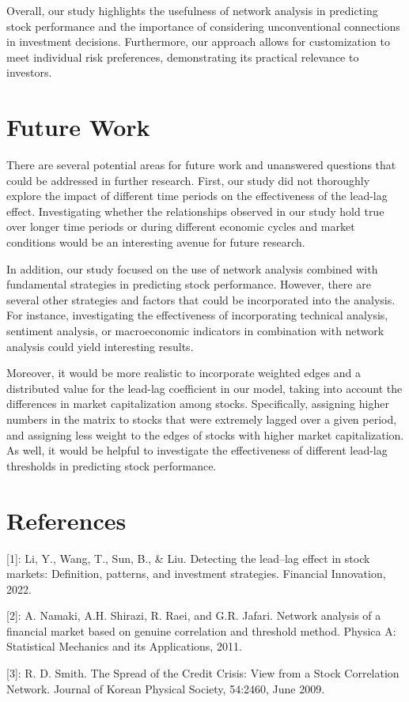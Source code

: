 \documentclass{article}
\begin{document}
Overall, our study highlights the usefulness of network analysis in predicting stock performance and the importance of considering unconventional connections in investment decisions. Furthermore, our approach allows for customization to meet individual risk preferences, demonstrating its practical relevance to investors.

\section{Future Work}
There are several potential areas for future work and unanswered questions that could be addressed in further research. First, our study did not thoroughly explore the impact of different time periods on the effectiveness of the lead-lag effect. Investigating whether the relationships observed in our study hold true over longer time periods or during different economic cycles and market conditions would be an interesting avenue for future research.

In addition, our study focused on the use of network analysis combined with fundamental strategies in predicting stock performance. However, there are several other strategies and factors that could be incorporated into the analysis. For instance, investigating the effectiveness of incorporating technical analysis, sentiment analysis, or macroeconomic indicators in combination with network analysis could yield interesting results. 

Moreover, it would be more realistic to incorporate weighted edges and a distributed value for the lead-lag coefficient in our model, taking into account the differences in market capitalization among stocks. Specifically, assigning higher numbers in the matrix to stocks that were extremely lagged over a given period, and assigning less weight to the edges of stocks with higher market capitalization. As well, it would be helpful to investigate the effectiveness of different lead-lag thresholds in predicting stock performance.

\section*{References}
[1]: Li, Y., Wang, T., Sun, B., \& Liu. Detecting the lead–lag effect in stock markets: Definition, patterns, and investment strategies. Financial Innovation, 2022.

[2]: A. Namaki, A.H. Shirazi, R. Raei, and G.R. Jafari. Network analysis of a financial market based on genuine correlation and threshold method. Physica A: Statistical
Mechanics and its Applications, 2011.

[3]: R. D. Smith. The Spread of the Credit Crisis: View
from a Stock Correlation Network. Journal of Korean
Physical Society, 54:2460, June 2009.

\medskip
\small
\end{document}
